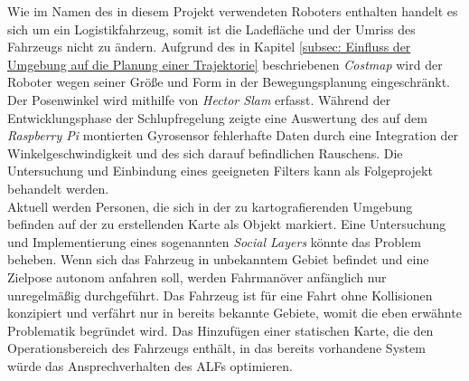 	Wie im Namen des in diesem Projekt verwendeten Roboters enthalten handelt es sich um ein Logistikfahrzeug, somit ist die Ladefläche und der Umriss des Fahrzeugs nicht zu ändern. Aufgrund des in Kapitel \ref{subsec: Einfluss der Umgebung auf die Planung einer Trajektorie} beschriebenen \textit{Costmap} wird der Roboter wegen seiner Größe und Form in der Bewegungsplanung eingeschränkt.\\
	
	Der Posenwinkel wird mithilfe von \textit{Hector Slam} erfasst. Während der Entwicklungsphase der Schlupfregelung zeigte eine Auswertung des auf dem \textit{Raspberry Pi} montierten Gyrosensor fehlerhafte Daten durch eine Integration der Winkelgeschwindigkeit und des sich darauf befindlichen Rauschens. Die Untersuchung und Einbindung eines geeigneten Filters kann als Folgeprojekt behandelt werden.\\
	
	Aktuell werden Personen, die sich in der zu kartografierenden Umgebung befinden auf der zu erstellenden Karte als Objekt markiert. Eine Untersuchung und Implementierung eines sogenannten \textit{Social Layers} könnte das Problem beheben. Wenn sich das Fahrzeug in unbekanntem Gebiet befindet und eine Zielpose autonom anfahren soll, werden Fahrmanöver anfänglich nur unregelmäßig durchgeführt. Das Fahrzeug ist für eine Fahrt ohne Kollisionen konzipiert und verfährt nur in bereits bekannte Gebiete, womit die eben erwähnte Problematik begründet wird. Das Hinzufügen einer statischen Karte, die den Operationsbereich des Fahrzeugs enthält, in das bereits vorhandene System würde das Ansprechverhalten des ALFs optimieren.\\
	




